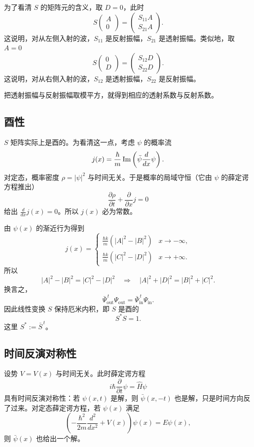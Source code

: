 为了看清 \(S\) 的矩阵元的含义，取 \(D=0\)，此时
\[
  S\begin{pmatrix}A\\ 0\end{pmatrix}=\begin{pmatrix}S_{11}A\\ S_{21}A\end{pmatrix}.
\]
这说明，对从左侧入射的波，\(S_{11}\) 是反射振幅，\(S_{21}\) 是透射振幅。类似地，取 \(A=0\)
\[
  S\begin{pmatrix}0\\ D\end{pmatrix}=\begin{pmatrix}S_{12}D\\ S_{22}D\end{pmatrix}.
\]
这说明，对从右侧入射的波，\(S_{12}\) 是透射振幅，\(S_{22}\) 是反射振幅。

把透射振幅与反射振幅取模平方，就得到相应的透射系数与反射系数。

\subsection{酉性}

\(S\) 矩阵实际上是酉的。为看清这一点，考虑 \(\psi\) 的概率流
\[
  j(x)=\frac{\hbar}{m}\operatorname{Im}\left(\bar\psi\frac{d}{dx}\psi\right).
\]
对定态，概率密度 \(\rho=|\psi|^2\) 与时间无关。于是概率的局域守恒（它由 \(\psi\) 的薛定谔方程推出）
\[
  \frac{\partial\rho}{\partial t}+\frac{\partial}{\partial x}j=0
\]
给出 \(\frac{d}{dx}j(x)=0\)。所以 \(j(x)\) 必为常数。

由 \(\psi(x)\) 的渐近行为得到
\[
  j(x)=
  \begin{cases}
    \frac{\hbar k}{m}\left(|A|^2-|B|^2\right) & x\to-\infty,\\[4pt]
    \frac{\hbar k}{m}\left(|C|^2-|D|^2\right) & x\to+\infty.
  \end{cases}
\]
所以
\[
  |A|^2-|B|^2=|C|^2-|D|^2
  \quad\Longrightarrow\quad
  |A|^2+|D|^2=|B|^2+|C|^2.
\]
换言之，
\[
  \bar\Psi_{\mathrm{out}}^{\,t}\Psi_{\mathrm{out}}=\bar\Psi_{\mathrm{in}}^{\,t}\Psi_{\mathrm{in}}.
\]
因此线性变换 \(S\) 保持厄米内积，即 \(S\) 是酉的
\[
  S^*S=1.
\]
这里 \(S^*:=\bar S^{\,t}\)。

\subsection{时间反演对称性}

设势 \(V=V(x)\) 与时间无关。此时薛定谔方程
\[
  i\hbar\frac{\partial}{\partial t}\psi=\hat H\psi
\]
具有时间反演对称性：若 \(\psi(x,t)\) 是解，则 \(\bar\psi(x,-t)\) 也是解，只是时间方向反了过来。对定态薛定谔方程，若 \(\psi(x)\) 满足
\[
  \left(-\frac{\hbar^2}{2m}\frac{d^2}{dx^2}+V(x)\right)\psi(x)=E\psi(x),
\]
则 \(\bar\psi(x)\) 也给出一个解。


